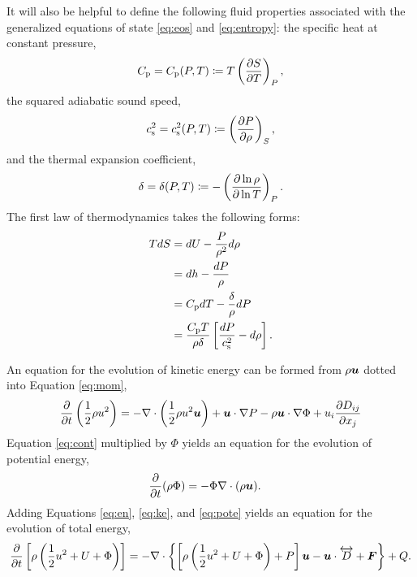 \documentclass[12pt]{article}
\newcommand{\vecf}{\bm{F}}
\begin{document}
	It will also be helpful to define the following fluid properties associated with the generalized equations of state \eqref{eq:eos} and \eqref{eq:entropy}: the specific heat at constant pressure, 
	\begin{align}\label{eq:cp}
		C_{\rm{p}}=C_{\rm{p}}(P,T)\coloneqq T\left(\frac{\partial S}{\partial T}\right)_P,
	\end{align}
	the squared adiabatic sound speed,
	\begin{align}\label{eq:cs2}
		c_{\rm s}^2=c_{\rm s}^2(P,T)\coloneqq \left(\frac{\partial P}{\partial\rho}\right)_S,
	\end{align}
	and the thermal expansion coefficient,
	\begin{align}
		\delta=\delta(P,T)\coloneqq-\left(\frac{\partial\ln\rho}{\partial\ln T}\right)_P.
	\end{align}
	The first law of thermodynamics takes the following forms:
	\begin{subequations}\label{eq:firstlaw}
	\begin{align}
		TdS &= dU - \frac{P}{\rho^2}d\rho \\
		&= dh - \frac{dP}{\rho}\\
		&= C_{\rm{p}} dT - \frac{\delta}{\rho}dP\\
		&=\frac{C_{\rm{p}} T}{\rho\delta}\left[\frac{dP}{c_{\rm s}^2}-d\rho\right].
	\end{align}
	\end{subequations}
	
	An equation for the evolution of kinetic energy can be formed from $\rho\bm{u}$ dotted into Equation \eqref{eq:mom},
	\begin{align}\label{eq:ke}
		\frac{\partial}{\partial t}\left(\frac{1}{2}\rho u^2\right) = - \nabla\cdot\left(\frac{1}{2}\rho u^2\bm{u} \right) + \bm{u}\cdot\nabla P - \rho\bm{u}\cdot\nabla\Phi+ u_i\frac{\partial D_{ij}}{\partial x_j}
	\end{align}
	Equation \eqref{eq:cont} multiplied by $\Phi$ yields an equation for the evolution of potential energy,
	\begin{align}\label{eq:pote}
		\frac{\partial}{\partial t}(\rho\Phi) &= - \Phi \nabla\cdot(\rho\bm{u}).
	\end{align}
	Adding Equations \eqref{eq:en}, \eqref{eq:ke}, and \eqref{eq:pote} yields an equation for the evolution of total energy,
	\begin{align}\label{eq:tote}
		\pderiv{}{t}\left[\rho\left(\frac{1}{2} u^2 + U + \Phi\right)\right] = -\Div\left\{\left[\rho\left(\frac{1}{2} u^2 + U + \Phi\right) + P\right]\vecu- \vecu\cdot\overleftrightarrow{D} + \vecf\right\} + Q.
	\end{align}
\end{document}
